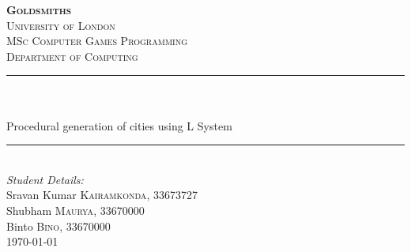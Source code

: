 \begin{titlepage}

\newcommand{\HRule}{\rule{\linewidth}{0.5mm}} %

\center %

\vspace*{\fill}\begin{center}
 
\textsc{\Huge \textbf {Goldsmiths}}\\ %
\textsc{\small University of London}\\[1.5cm] %
\textsc{\Large MSc Computer Games Programming}\\[0.5cm] %
\textsc{\large Department of Computing}\\[0.5cm] %

\makeatletter
\HRule \\[0.4cm]
{ \huge \bfseries \@title}\\[0.1cm] \large Procedural generation of cities using L System
\HRule \\[1.5cm]
 
\Large \emph{Student Details:}\\ [0.2cm]
\large Sravan Kumar \textsc{Kairamkonda}, 33673727\\[0.2cm]
\large Shubham \textsc{Maurya}, 33670000\\[0.2cm] %
\large Binto \textsc{Bino}, 33670000\\[2cm]


{\large \today}\\[2cm] %


\end{center}\vspace*{\fill}
\end{titlepage}